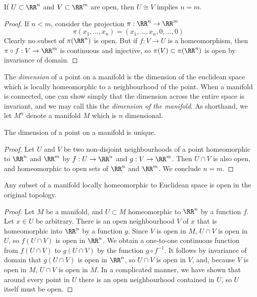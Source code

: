\begin{lemma}
    If $U \subset \RR^n$ and $V \subset \RR^m$ are open, then $U \cong V$ implies $n = m$.
\end{lemma}
\begin{proof}
    If $n < m$, consider the projection $\pi: \RR^n \to \RR^m$
    \[ \pi(x_1, \dots, x_n) = (x_1, \dots, x_n, 0, \dots, 0) \]
    Clearly no subset of $\pi(\RR^n)$ is open. But if $f: V \to U$ is a homeomorphism, then $\pi \circ f: V \to \RR^m$ is continuous and injective, so $\pi(V) \subset \pi(\RR^n)$ is open by invariance of domain.
\end{proof}

The \emph{dimension} of a point on a manifold is the dimension of the euclidean space which is locally homeomorphic to a neighbourhood of the point. When a manifold is connected, one can show simply that the dimension across the entire space is invariant, and we may call this the \emph{dimension of the manifold}. As shorthand, we let $M^n$ denote a manifold $M$ which is $n$ dimensional.

\begin{corollary}
    The dimension of a point on a manifold is unique.
\end{corollary}
\begin{proof}
    Let $U$ and $V$ be two non-disjoint neighbourhoods of a point homeomorphic to $\RR^n$ and $\RR^m$ by $f:U \to \RR^n$ and $g:V \to \RR^m$. Then $U \cap V$ is also open, and homeomorphic to open sets of $\RR^n$ and $\RR^m$. We conclude $n = m$.
\end{proof}

\begin{theorem}
    Any subset of a manifold locally homeomorphic to Euclidean space is open in the original topology.
\end{theorem}
\begin{proof}
    Let $M$ be a manifold, and $U \subset M$ homeomorphic to $\RR^n$ by a function $f$. Let $x \in U$ be arbitrary. There is an open neighbourhood $V$ of $x$ that is homeomorphic into $\RR^n$ by a function $g$. Since $V$ is open in $M$, $U \cap V$ is open in $U$, so $f(U \cap V)$ is open in $\RR^n$. We obtain a one-to-one continuous function from $f(U \cap V)$ to $g(U \cap V)$ by the function $g \circ f^{-1}$. It follows by invariance of domain that $g(U \cap V)$ is open in $\RR^n$, so $U \cap V$ is open in $V$, and, because $V$ is open in $M$, $U \cap V$ is open in $M$. In a complicated manner, we have shown that around every point in $U$ there is an open neighbourhood contained in $U$, so $U$ itself must be open.
\end{proof}

